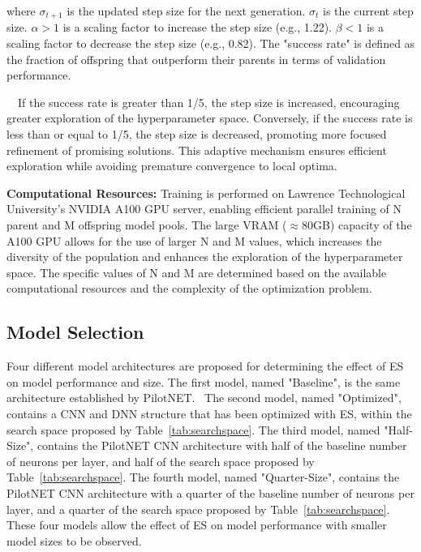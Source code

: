 \documentclass[conference]{IEEEtran}
\begin{document}
\begin{enumerate}
          where \(\sigma_{t+1}\) is the updated step size for the next generation. \(\sigma_t\) is the current step size. \(\alpha > 1\) is a scaling factor to increase the step size (e.g., 1.22). \(\beta < 1\) is a scaling factor to decrease the step size (e.g., 0.82). The "success rate" is defined as the fraction of offspring that outperform their parents in terms of validation performance.

          ~~If the success rate is greater than 1/5, the step size is increased, encouraging greater exploration of the hyperparameter space. Conversely, if the success rate is less than or equal to 1/5, the step size is decreased, promoting more focused refinement of promising solutions. This adaptive mechanism ensures efficient exploration while avoiding premature convergence to local optima.

\end{enumerate}

\textbf{Computational Resources: } Training is performed on Lawrence Technological University's NVIDIA A100 GPU server, enabling efficient parallel training of N parent and M offspring model pools. The large VRAM (\(\approx{}\)80GB) capacity of the A100 GPU allows for the use of larger N and M values, which increases the diversity of the population and enhances the exploration of the hyperparameter space. The specific values of N and M are determined based on the available computational resources and the complexity of the optimization problem.

\subsection{Model Selection}

Four different model architectures are proposed for determining the effect of ES on model performance and size. The first model, named "Baseline", is the same architecture established by PilotNET.~\cite{PilotNET} The second model, named "Optimized", contains a CNN and DNN structure that has been optimized with ES, within the search space proposed by Table~\ref{tab:searchspace}. The third model, named "Half-Size", contains the PilotNET CNN architecture with half of the baseline number of neurons per layer, and half of the search space proposed by Table~\ref{tab:searchspace}. The fourth model, named "Quarter-Size", contains the PilotNET CNN architecture with a quarter of the baseline number of neurons per layer, and a quarter of the search space proposed by Table~\ref{tab:searchspace}. These four models allow the effect of ES on model performance with smaller model sizes to be observed.
\end{document}
